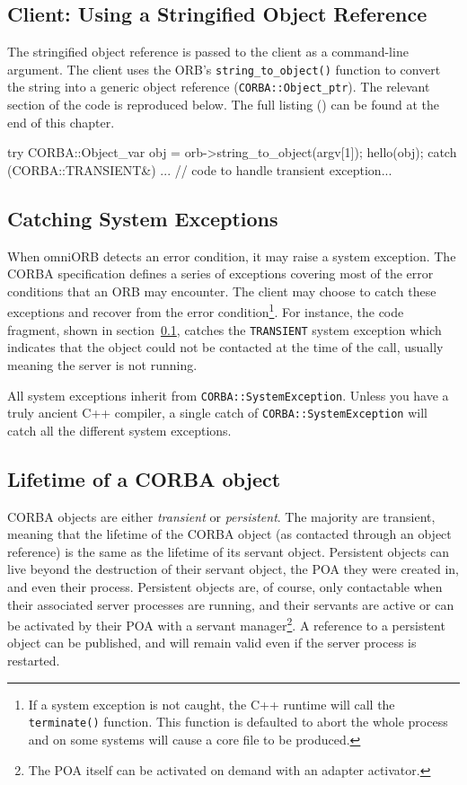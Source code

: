 \documentclass[11pt,twoside,a4paper]{book}
\newcommand{\type}[1]{\texttt{#1}}
\newcommand{\code}[1]{\texttt{#1}}
\newcommand{\op}[1]{\texttt{#1()}}
\newcommand{\term}[1]{\textit{#1}}
\newcommand{\file}{\begingroup \urlstyle{tt}\Url}
\begin{document}
\subsection{Client: Using a Stringified Object Reference}
\label{clnt2}

The stringified object reference is passed to the client as a
command-line argument. The client uses the ORB's
\op{string\_to\_object} function to convert the string into a generic
object reference (\type{CORBA::Object\_ptr}). The relevant section of
the code is reproduced below. The full listing (\file{eg2_clt.cc}) can
be found at the end of this chapter.

\begin{cxxlisting}
try {
  CORBA::Object_var obj = orb->string_to_object(argv[1]);
  hello(obj);
}
catch (CORBA::TRANSIENT&) {
  ... // code to handle transient exception...
}
\end{cxxlisting}


\subsection{Catching System Exceptions}

When omniORB detects an error condition, it may raise a system
exception.  The CORBA specification defines a series of exceptions
covering most of the error conditions that an ORB may encounter. The
client may choose to catch these exceptions and recover from the error
condition\footnote{If a system exception is not caught, the C++
runtime will call the \op{terminate} function. This function is
defaulted to abort the whole process and on some systems will cause a
core file to be produced.}. For instance, the code fragment, shown in
section~\ref{clnt2}, catches the \code{TRANSIENT} system exception
which indicates that the object could not be contacted at the time of
the call, usually meaning the server is not running.

All system exceptions inherit from \type{CORBA::SystemException}.
Unless you have a truly ancient C++ compiler, a single catch of
\code{CORBA::SystemException} will catch all the different system
exceptions.


\subsection{Lifetime of a CORBA object}

CORBA objects are either \term{transient} or \term{persistent}. The
majority are transient, meaning that the lifetime of the CORBA object
(as contacted through an object reference) is the same as the lifetime
of its servant object. Persistent objects can live beyond the
destruction of their servant object, the POA they were created in, and
even their process. Persistent objects are, of course, only
contactable when their associated server processes are running, and
their servants are active or can be activated by their POA with a
servant manager\footnote{The POA itself can be activated on demand
  with an adapter activator.}. A reference to a persistent object can
be published, and will remain valid even if the server process is
restarted.
\end{document}
